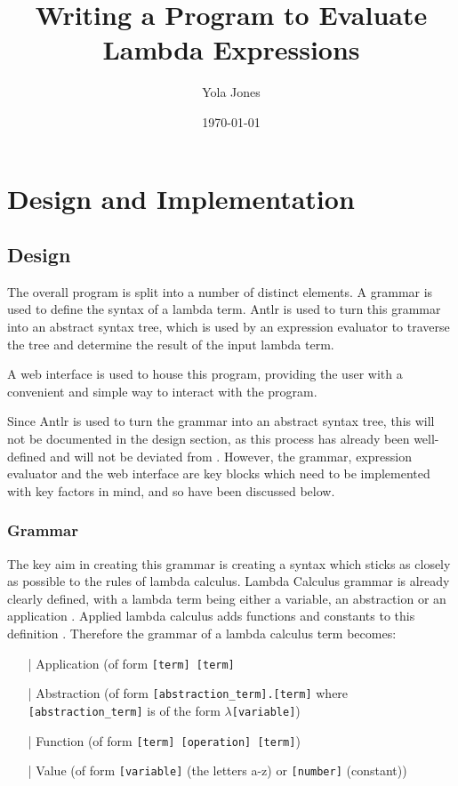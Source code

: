 \documentclass[a4paper,12pt]{report}
\begin{document}
\title{Writing a Program to Evaluate Lambda Expressions}
\author{Yola Jones}
\date{\today}
\maketitle

\chapter{Design and Implementation}
\section{Design}

The overall program is split into a number of distinct elements. A grammar is used to define the syntax of a lambda term. Antlr is used to turn this grammar into an abstract syntax tree, which is used by an expression evaluator to traverse the tree and determine the result of the input lambda term.

A web interface is used to house this program, providing the user with a convenient and simple way to interact with the program.

Since Antlr is used to turn the grammar into an abstract syntax tree, this will not be documented in the design section, as this process has already been well-defined and will not be deviated from \cite{Parr2012}. However, the grammar, expression evaluator and the web interface are key blocks which need to be implemented with key factors in mind, and so have been discussed below. 

\subsection{Grammar}

The key aim in creating this grammar is creating a syntax which sticks as closely as possible to the rules of lambda calculus. Lambda Calculus grammar is already clearly defined, with a lambda term being either a variable, an abstraction or an application \cite{Hankin2004}. Applied lambda calculus adds functions and constants to this definition \cite{Slonneger1995}. Therefore the grammar of a lambda calculus term becomes:

\begin{itemize}
\item[|] Application (of form \texttt{[term] [term]}
\item[|] Abstraction (of form \texttt{[abstraction_term].[term]} where \texttt{[abstraction_term]} is of the form \texttt{$\lambda$[variable]})
\item[|] Function (of form \texttt{[term] [operation] [term]})
\item[|] Value (of form \texttt{[variable]} (the letters a-z) or \texttt{[number]} (constant))
\end{itemize}
\end{document}
